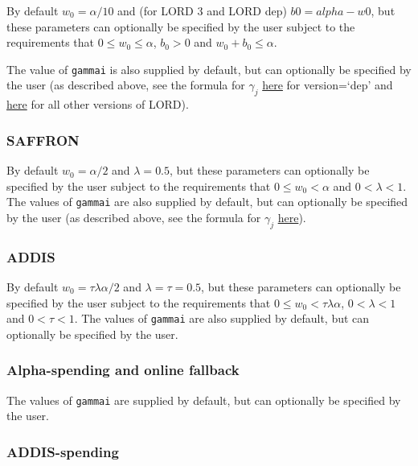 \documentclass[
]{article}
\begin{document}
By default \(w_0 = \alpha/10\) and (for LORD 3 and LORD dep)
\(b0 = alpha - w0\), but these parameters can optionally be specified by
the user subject to the requirements that \(0 \leq w_0 \leq \alpha\),
\(b_0 > 0\) and \(w_0+b_0 \leq \alpha\).

The value of \texttt{gammai} is also supplied by default, but can
optionally be specified by the user (as described above, see the formula
for \(\gamma_j\) \protect\hyperlink{LORDdep_xi}{here} for version=`dep'
and \protect\hyperlink{LORD_gamma}{here} for all other versions of
LORD).

\hypertarget{saffron}{%
\subsubsection{SAFFRON}\label{saffron}}

By default \(w_0 = \alpha/2\) and \(\lambda = 0.5\), but these
parameters can optionally be specified by the user subject to the
requirements that \(0 \leq w_0 < \alpha\) and \(0 < \lambda < 1\). The
values of \texttt{gammai} are also supplied by default, but can
optionally be specified by the user (as described above, see the formula
for \(\gamma_j\) \protect\hyperlink{SAFFRON_gamma}{here}).

\hypertarget{addis}{%
\subsubsection{ADDIS}\label{addis}}

By default \(w_0 = \tau \lambda \alpha/2\) and \(\lambda = \tau = 0.5\),
but these parameters can optionally be specified by the user subject to
the requirements that \(0 \leq w_0 < \tau \lambda \alpha\),
\(0 < \lambda < 1\) and \(0 < \tau < 1\). The values of \texttt{gammai}
are also supplied by default, but can optionally be specified by the
user.

\hypertarget{alpha-spending-and-online-fallback}{%
\subsubsection{Alpha-spending and online
fallback}\label{alpha-spending-and-online-fallback}}

The values of \texttt{gammai} are supplied by default, but can
optionally be specified by the user.

\hypertarget{addis-spending}{%
\subsubsection{ADDIS-spending}\label{addis-spending}}
\end{document}

